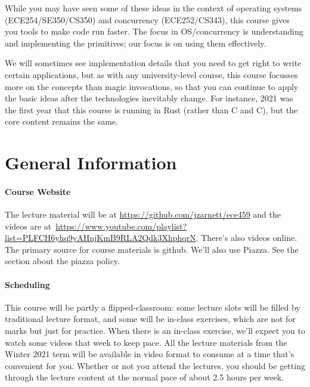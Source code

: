\documentclass[letterpaper,10pt]{article}
\newcommand{\CPP}{C\nolinebreak\hspace{-.05em}\raisebox{.4ex}{\tiny\bf +}\nolinebreak\hspace{-.10em}\raisebox{.4ex}{\tiny\bf +}}
\def\CPP{{C\nolinebreak[4]\hspace{-.05em}\raisebox{.4ex}{\tiny\bf ++}}}
\begin{document}
While you may have seen some of these ideas in the context of
operating systems (ECE254/SE350/CS350) and concurrency (ECE252/CS343), this course gives you tools to make code run
faster. The focus in OS/concurrency is understanding and implementing the
primitives; our focus is on using them effectively. 

We will sometimes see implementation details that you need to get right to write
certain applications, but as with any university-level course, this course
focusses more on the concepts than magic invocations, so that you can continue
to apply the basic ideas after the technologies inevitably change. For instance,
2021 was the first year that this course is running in Rust (rather than C and \CPP),
but the core content remains the same.


\section*{General Information}

\paragraph{Course Website} The lecture material will be at \url{https://github.com/jzarnett/ece459} and the videos are at~\url{https://www.youtube.com/playlist?list=PLFCH6yhq9yAHnjKmB9RLA2Qdk3XhphqrN}. There's also videos online.  The primary source for course materials is github. We'll also use Piazza. See the section about the piazza policy.

\paragraph{Scheduling}
This course will be partly a flipped-classroom: some lecture slots will be filled by traditional lecture format, and some will be in-class exercises, which are not for marks but just for practice. When there is an in-class exercise, we'll expect you to watch some videos that week to keep pace. All the lecture materials from the Winter 2021 term will be available in video format to consume at a time that's convenient for you.  Whether or not you attend the lectures, you should be getting through the lecture content at the normal pace of about 2.5 hours per week.


  
\end{document}
